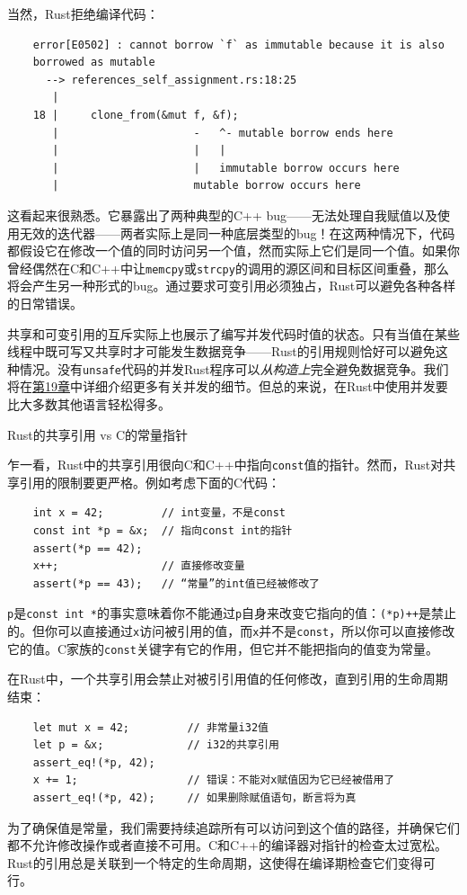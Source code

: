 当然，Rust拒绝编译代码：
\begin{verbatim}
    error[E0502] : cannot borrow `f` as immutable because it is also 
    borrowed as mutable 
      --> references_self_assignment.rs:18:25
       |
    18 |     clone_from(&mut f, &f);
       |                     -   ^- mutable borrow ends here 
       |                     |   |
       |                     |   immutable borrow occurs here 
       |                     mutable borrow occurs here
\end{verbatim}

这看起来很熟悉。它暴露出了两种典型的C++ bug——无法处理自我赋值以及使用无效的迭代器——两者实际上是同一种底层类型的bug！在这两种情况下，代码都假设它在修改一个值的同时访问另一个值，然而实际上它们是同一个值。如果你曾经偶然在C和C++中让\texttt{memcpy}或\texttt{strcpy}的调用的源区间和目标区间重叠，那么将会产生另一种形式的bug。通过要求可变引用必须独占，Rust可以避免各种各样的日常错误。

共享和可变引用的互斥实际上也展示了编写并发代码时值的状态。只有当值在某些线程中既可写又共享时才可能发生数据竞争——Rust的引用规则恰好可以避免这种情况。没有\texttt{unsafe}代码的并发Rust程序可以\emph{从构造上}完全避免数据竞争。我们将在\hyperref[ch19]{第19章}中详细介绍更多有关并发的细节。但总的来说，在Rust中使用并发要比大多数其他语言轻松得多。

\clearpage

\begin{shaded}
    \begin{center}
        \Large{Rust的共享引用 vs C的常量指针}
    \end{center}

    乍一看，Rust中的共享引用很向C和C++中指向\texttt{const}值的指针。然而，Rust对共享引用的限制要更严格。例如考虑下面的C代码：
    \begin{verbatim}
    int x = 42;         // int变量，不是const
    const int *p = &x;  // 指向const int的指针
    assert(*p == 42);
    x++;                // 直接修改变量
    assert(*p == 43);   // “常量”的int值已经被修改了
    \end{verbatim}

    \texttt{p}是\texttt{const int *}的事实意味着你不能通过\texttt{p}自身来改变它指向的值：\texttt{(*p)++}是禁止的。但你可以直接通过\texttt{x}访问被引用的值，而\texttt{x}并不是\texttt{const}，所以你可以直接修改它的值。C家族的\texttt{const}关键字有它的作用，但它并不能把指向的值变为常量。

    在Rust中，一个共享引用会禁止对被引引用值的任何修改，直到引用的生命周期结束：
    \begin{verbatim}
    let mut x = 42;         // 非常量i32值
    let p = &x;             // i32的共享引用
    assert_eq!(*p, 42);
    x += 1;                 // 错误：不能对x赋值因为它已经被借用了
    assert_eq!(*p, 42);     // 如果删除赋值语句，断言将为真
    \end{verbatim}

    为了确保值是常量，我们需要持续追踪所有可以访问到这个值的路径，并确保它们都不允许修改操作或者直接不可用。C和C++的编译器对指针的检查太过宽松。Rust的引用总是关联到一个特定的生命周期，这使得在编译期检查它们变得可行。
\end{shaded}    

